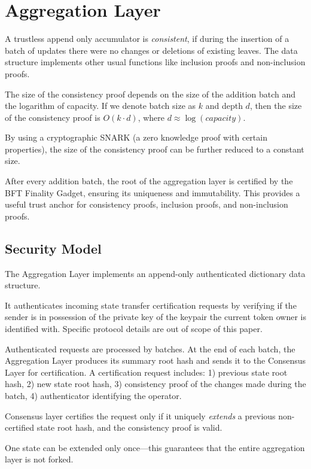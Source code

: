 \documentclass[twocolumn]{article}
\begin{document}
\section{Aggregation Layer}

A trustless append only accumulator is \emph{consistent}, if during the insertion of a batch of updates there were no changes or deletions of existing leaves. The data structure implements other usual functions like inclusion proofs and non-inclusion proofs.

The size of the consistency proof depends on the size of the addition batch and the logarithm of capacity. If we denote batch size as $k$ and depth $d$, then the size of the consistency proof is $O(k \cdot d)$, where $d \approx \log(capacity)$.

By using a cryptographic SNARK (a zero knowledge proof with certain properties), the size of the consistency proof can be further reduced to a constant size.

After every addition batch, the root of the aggregation layer is certified by the BFT Finality Gadget, ensuring its uniqueness and immutability. This provides a useful trust anchor for consistency proofs, inclusion proofs, and non-inclusion proofs.


\subsection{Security Model}

The Aggregation Layer implements an append-only authenticated dictionary data structure.

It authenticates incoming state transfer certification requests by verifying if the sender is in possession of the private key of the keypair the current token owner is identified with. Specific protocol details are out of scope of this paper.

Authenticated requests are processed by batches. At the end of each batch, the Aggregation Layer produces its summary root hash and sends it to the Consensus Layer for certification. A certification request includes: 1) previous state root hash, 2) new state root hash, 3) consistency proof of the changes made during the batch, 4) authenticator identifying the operator.

Consensus layer certifies the request only if it uniquely \textit{extends} a previous non-certified state root hash, and the consistency proof is valid.

One state can be extended only once---this guarantees that the entire aggregation layer is not forked.
\end{document}
